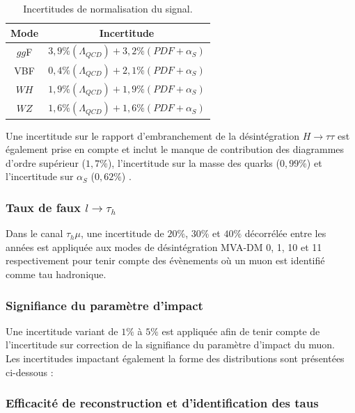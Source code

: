 \begin{table}[!ht]
\centering
\begin{tabular}{|c|c|}
\hline
Mode  & Incertitude                                                       \\ \hline
$gg$F & $3,9\%(\Lambda_{QCD})+3,2\%(PDF+\alpha_{S})$                      \\ \hline
VBF   & $0,4\%(\Lambda_{QCD})+2,1\%(PDF+\alpha_{S})$                      \\ \hline
$WH$  & $1,9\%(\Lambda_{QCD})+1,9\%(PDF+\alpha_{S})$                      \\ \hline
$WZ$  & \multicolumn{1}{l|}{$1,6\%(\Lambda_{QCD})+1,6\%(PDF+\alpha_{S})$} \\ \hline
\end{tabular}
\caption{Incertitudes de normalisation du signal.}
\label{XSincHiggs}
\end{table}

Une incertitude sur le rapport d'embranchement de la désintégration $H\to\tau\tau$ est également prise en compte et inclut le manque de contribution des diagrammes d'ordre supérieur ($1,7\%$), l'incertitude sur la masse des quarks ($0,99\%$) et l'incertitude sur $\alpha_S$ ($0,62\%$) \cite{LHCHiggsCrossSectionWorkingGroup:2016ypw}.

\subsubsection{ Taux de faux $l\rightarrow\tau_h$}

Dans le canal $\tau_h\mu$, une incertitude de $20\%$, $30\%$ et $40\%$ décorrélée entre les années est appliquée aux modes de désintégration MVA-DM 0, 1, 10 et 11 respectivement pour tenir compte des évènements où un muon est identifié comme tau hadronique.

\subsubsection{ Signifiance du paramètre d'impact}

Une incertitude variant de $1\%$ à $5\%$ est appliquée afin de tenir compte de l'incertitude sur correction de la signifiance du paramètre d'impact du muon. \\

Les incertitudes impactant également la forme des distributions sont présentées ci-dessous :

\subsubsection{ Efficacité de reconstruction et d'identification des taus}

